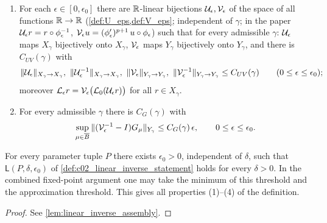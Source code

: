 \begin{definition}
\begin{enumerate}
\begin{equation}
      \end{equation}
    \item For each $\epsilon\in[0,\epsilon_0]$ there are $\mathbb{R}$-linear bijections $\mathcal{U}_\epsilon,\mathcal{V}_\epsilon$ of the space of
      all functions $\mathbb{R}\to\mathbb{R}$ (\cref{def:U_eps,def:V_eps}; independent of $\gamma$; in the paper
      $\mathcal{U}_\epsilon r=r\circ\phi_\epsilon^{-1}$, $\mathcal{V}_\epsilon u=(\phi_\epsilon')^{p+1}\,u\circ\phi_\epsilon$) such that for every admissible $\gamma$:
      $\mathcal{U}_\epsilon$ maps $X_\gamma$ bijectively onto $X_\gamma$, $\mathcal{V}_\epsilon$ maps $Y_\gamma$ bijectively onto $Y_\gamma$, and there is $C_{UV}(\gamma)$ with
      \[
        \|\mathcal{U}_\epsilon\|_{X_\gamma\to X_\gamma},\ \|\mathcal{U}_\epsilon^{-1}\|_{X_\gamma\to X_\gamma},\ \|\mathcal{V}_\epsilon\|_{Y_\gamma\to Y_\gamma},\
        \|\mathcal{V}_\epsilon^{-1}\|_{Y_\gamma\to Y_\gamma}\le C_{UV}(\gamma)\qquad(0\le\epsilon\le\epsilon_0);
      \]
      moreover $\mathcal{L}_\epsilon r=\mathcal{V}_\epsilon\bigl(\mathcal{L}_0(\mathcal{U}_\epsilon r)\bigr)$ for all $r\in X_\gamma$.
    \item For every admissible $\gamma$ there is $C_G(\gamma)$ with
      \begin{equation}\label{eqn:fixed_point_residual_transport}
        \sup_{\mu\in\overline{B}}\|(\mathcal{V}_\epsilon^{-1}-I)G_\mu\|_{Y_\gamma}\le C_G(\gamma)\,\epsilon,\qquad 0\le\epsilon\le\epsilon_0 .
      \end{equation}
  \end{enumerate}
\end{definition}

\begin{theorem}
  \label{thm:fixed_point_linear_inverse}
  For every parameter tuple $P$ there exists $\epsilon_0>0$, independent of $\delta$, such that
  $\mathsf L(P,\delta,\epsilon_0)$ of \cref{def:c02_linear_inverse_statement} holds for every $\delta>0$.
  In the combined fixed-point argument one may take the minimum of this threshold and the
  approximation threshold. This gives all properties (1)--(4) of the definition.
\end{theorem}
\begin{proof}
  See \cref{lem:linear_inverse_assembly}.
\end{proof}

